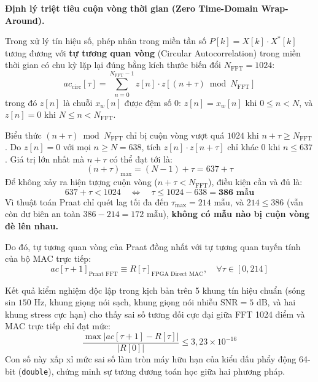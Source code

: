 \begin{equationcard}
\textbf{Định lý triệt tiêu cuộn vòng thời gian (Zero Time-Domain Wrap-Around).}
\par\noindent Trong xử lý tín hiệu số, phép nhân trong miền tần số $P[k] = X[k] \cdot X^*[k]$ tương đương với \textbf{tự tương quan vòng} (Circular Autocorrelation) trong miền thời gian có chu kỳ lặp lại đúng bằng kích thước biến đổi $N_{\text{FFT}} = 1024$:
\begin{equation}
ac_{\text{circ}}[\tau] = \sum_{n=0}^{N_{\text{FFT}}-1} z[n] \cdot z[(n+\tau) \bmod N_{\text{FFT}}]
\end{equation}
trong đó $z[n]$ là chuỗi $x_w[n]$ được đệm số $0$: $z[n] = x_w[n]$ khi $0 \le n < N$, và $z[n] = 0$ khi $N \le n < N_{\text{FFT}}$.
\par\noindent Biểu thức $(n+\tau) \bmod N_{\text{FFT}}$ chỉ bị cuộn vòng vượt quá $1024$ khi $n + \tau \ge N_{\text{FFT}}$. Do $z[n] = 0$ với mọi $n \ge N = 638$, tích $z[n] \cdot z[n+\tau]$ chỉ khác $0$ khi $n \le 637$. Giá trị lớn nhất mà $n+\tau$ có thể đạt tới là:
\begin{equation}
(n+\tau)_{\max} = (N - 1) + \tau = 637 + \tau
\end{equation}
Để không xảy ra hiện tượng cuộn vòng ($n+\tau < N_{\text{FFT}}$), điều kiện cần và đủ là:
\begin{equation}
637 + \tau < 1024 \quad \Longleftrightarrow \quad \tau \le 1024 - 638 = \mathbf{386\text{ mẫu}}
\end{equation}
Vì thuật toán Praat chỉ quét lag tối đa đến $\tau_{\max} = 214\text{ mẫu}$, và $214 \le 386$ (vẫn còn dư biên an toàn $386 - 214 = 172\text{ mẫu}$), \textbf{không có mẫu nào bị cuộn vòng đè lên nhau.}
\par\noindent Do đó, tự tương quan vòng của Praat đồng nhất với tự tương quan tuyến tính của bộ MAC trực tiếp:
\begin{equation}
ac[\tau+1]_{\text{Praat FFT}} \equiv R[\tau]_{\text{FPGA Direct MAC}}, \quad \forall \tau \in [0, 214]
\end{equation}
\end{equationcard}

Kết quả kiểm nghiệm độc lập trong kịch bản  trên 5 khung tín hiệu chuẩn (sóng sin $150\text{ Hz}$, khung giọng nói sạch, khung giọng nói nhiễu $\text{SNR} = 5\text{ dB}$, và hai khung stress cực hạn) cho thấy sai số tương đối cực đại giữa FFT 1024 điểm và MAC trực tiếp chỉ đạt mức:
\begin{equation}
\frac{\max |ac[\tau+1] - R[\tau]|}{|R[0]|} \le 3{,}23 \times 10^{-16}
\end{equation}
Con số này xấp xỉ mức sai số làm tròn máy hữu hạn của kiểu dấu phẩy động 64-bit (\texttt{double}), chứng minh sự tương đương toán học giữa hai phương pháp.

